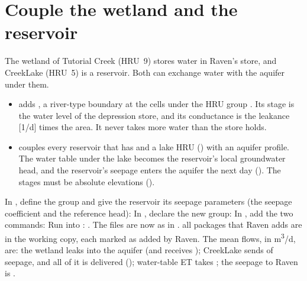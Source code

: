 \section{Couple the wetland and the reservoir}
The wetland of Tutorial Creek (HRU~9) stores water in Raven's  store, and CreekLake (HRU~5) is a
reservoir. Both can exchange water with the aquifer under them.
\begin{itemize}
\item {} adds , a river-type boundary at the
  cells under the HRU group . Its stage is the water level of the depression store, and its conductance
  is the leakance [1/d] times the area. It never takes more water than the store holds.
\item {} couples every reservoir that has  and a lake HRU () with
  an aquifer profile. The water table under the lake becomes the reservoir's local groundwater head, and the reservoir's
  seepage enters the aquifer the next day (). The stages must be absolute elevations
  ().
\end{itemize}

\label{st:wetres}
In , define the group  and give the reservoir its seepage parameters (the seepage
coefficient and the reference head):
In , declare the new group:
In , add the two commands:
Run into :
\see {}. The files are now as in .
\why all  packages that Raven adds are in the working copy, each marked as added by Raven. The mean flows, in
m\textsuperscript{3}/d, are: the wetland leaks  into the aquifer (and receives ); CreekLake
sends  of seepage, and all of it is delivered (); water-table ET takes ; the
seepage to Raven is .
